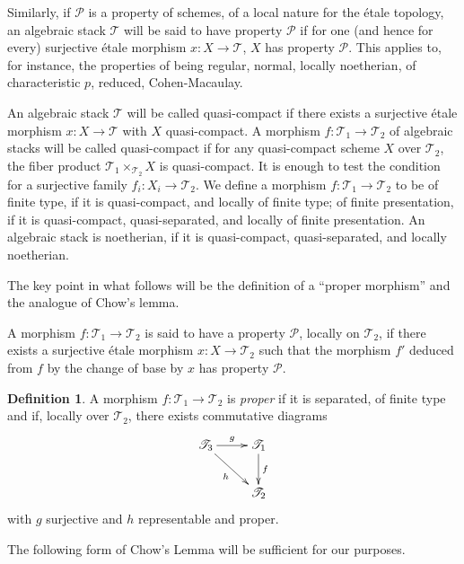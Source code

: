 \documentclass[10pt]{amsart}
\theoremstyle{plain}
\theoremstyle{definition}
\newtheorem{definition}[theorem]{Definition}
\begin{document}
Similarly, if $\mathscr{P}$ is a property of schemes, of a local nature for the \'etale topology, an algebraic stack $\mathscr{T}$ will be said to have property $\mathscr{P}$ if for one (and hence for every) surjective \'etale morphism $x: X \to \mathscr{T}$, $X$ has property $\mathscr{P}$. This applies to, for instance, the properties of being regular, normal, locally noetherian, of characteristic $p$, reduced, Cohen-Macaulay.

An algebraic stack $\mathscr{T}$ will be called quasi-compact if there exists a surjective \'etale morphism $x: X \to \mathscr{T}$ with $X$ quasi-compact. A morphism $f: \mathscr{T}_1 \to \mathscr{T}_2$ of algebraic stacks will be called quasi-compact if for any quasi-compact scheme $X$ over $\mathscr{T}_2$, the fiber product $\mathscr{T}_1 \times_{\mathscr{T}_2} X$ is quasi-compact. It is enough to test the condition for a surjective family $f_i: X_i \to \mathscr{T}_2$. We define a morphism $f: \mathscr{T}_1 \to \mathscr{T}_2$ to be of finite type, if it is quasi-compact, and locally of finite type; of finite presentation, if it is quasi-compact, quasi-separated, and locally of finite presentation. An algebraic stack is noetherian, if it is quasi-compact, quasi-separated, and locally noetherian.

The key point in what follows will be the definition of a ``proper morphism'' and the analogue of Chow's lemma.

A morphism $f: \mathscr{T}_1 \to \mathscr{T}_2$ is said to have a property $\mathscr{P}$, locally on $\mathscr{T}_2$, if there exists a surjective \'etale morphism $x: X \to \mathscr{T}_2$ such that the morphism $f'$ deduced from $f$ by the change of base by $x$ has property $\mathscr{P}$.

\begin{definition}\label{def:4.11}
A morphism $f: \mathscr{T}_1 \to \mathscr{T}_2$ is \emph{proper} if it is separated, of finite type and if, locally over $\mathscr{T}_2$, there exists commutative diagrams
\[
\xymatrix{
\mathscr{T}_3 \ar[r]^g \ar[dr]_h & \mathscr{T}_1 \ar[d]^f \\
& \mathscr{T}_2
}
\]
with $g$ surjective and $h$ representable and proper.
\end{definition}

The following form of Chow's Lemma will be sufficient for our purposes.
\end{document}
